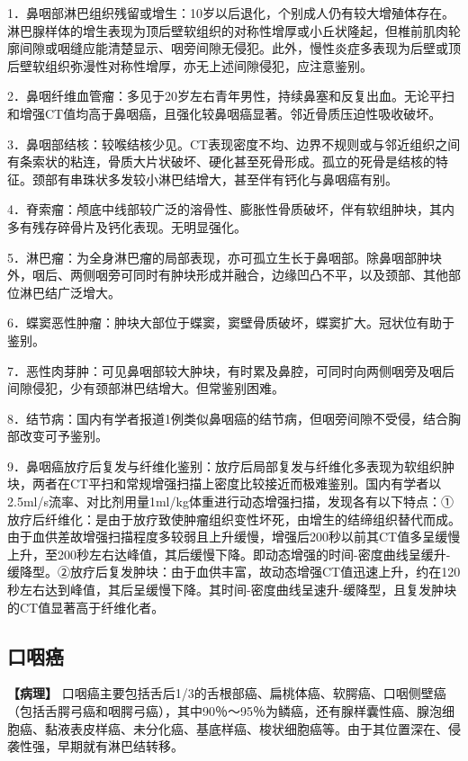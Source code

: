 1．鼻咽部淋巴组织残留或增生：10岁以后退化，个别成人仍有较大增殖体存在。淋巴腺样体的增生表现为顶后壁软组织的对称性增厚或小丘状隆起，但椎前肌肉轮廓间隙或咽缝应能清楚显示、咽旁间隙无侵犯。此外，慢性炎症多表现为后壁或顶后壁软组织弥漫性对称性增厚，亦无上述间隙侵犯，应注意鉴别。

2．鼻咽纤维血管瘤：多见于20岁左右青年男性，持续鼻塞和反复出血。无论平扫和增强CT值均高于鼻咽癌，且强化较鼻咽癌显著。邻近骨质压迫性吸收破坏。

3．鼻咽部结核：较喉结核少见。CT表现密度不均、边界不规则或与邻近组织之间有条索状的粘连，骨质大片状破坏、硬化甚至死骨形成。孤立的死骨是结核的特征。颈部有串珠状多发较小淋巴结增大，甚至伴有钙化与鼻咽癌有别。

4．脊索瘤：颅底中线部较广泛的溶骨性、膨胀性骨质破坏，伴有软组肿块，其内多有残存碎骨片及钙化表现。无明显强化。

5．淋巴瘤：为全身淋巴瘤的局部表现，亦可孤立生长于鼻咽部。除鼻咽部肿块外，咽后、两侧咽旁可同时有肿块形成并融合，边缘凹凸不平，以及颈部、其他部位淋巴结广泛增大。

6．蝶窦恶性肿瘤：肿块大部位于蝶窦，窦壁骨质破坏，蝶窦扩大。冠状位有助于鉴别。

7．恶性肉芽肿：可见鼻咽部较大肿块，有时累及鼻腔，可同时向两侧咽旁及咽后间隙侵犯，少有颈部淋巴结增大。但常鉴别困难。

8．结节病：国内有学者报道1例类似鼻咽癌的结节病，但咽旁间隙不受侵，结合胸部改变可予鉴别。

9．鼻咽癌放疗后复发与纤维化鉴别：放疗后局部复发与纤维化多表现为软组织肿块，两者在CT平扫和常规增强扫描上密度比较接近而极难鉴别。国内有学者以2.5ml/s流率、对比剂用量1ml/kg体重进行动态增强扫描，发现各有以下特点：①放疗后纤维化：是由于放疗致使肿瘤组织变性坏死，由增生的结缔组织替代而成。由于血供差故增强扫描程度多较弱且上升缓慢，增强后200秒以前其CT值多呈缓慢上升，至200秒左右达峰值，其后缓慢下降。即动态增强的时间-密度曲线呈缓升-缓降型。②放疗后复发肿块：由于血供丰富，故动态增强CT值迅速上升，约在120秒左右达到峰值，其后呈缓慢下降。其时间-密度曲线呈速升-缓降型，且复发肿块的CT值显著高于纤维化者。

\subsection{口咽癌}

\textbf{【病理】}
口咽癌主要包括舌后1/3的舌根部癌、扁桃体癌、软腭癌、口咽侧壁癌（包括舌腭弓癌和咽腭弓癌），其中90％～95％为鳞癌，还有腺样囊性癌、腺泡细胞癌、黏液表皮样癌、未分化癌、基底样癌、梭状细胞癌等。由于其位置深在、侵袭性强，早期就有淋巴结转移。

